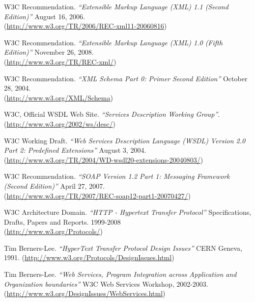 \begin{thebibliography}{99}
 W3C Recommendation. \emph{``Extensible Markup Language (XML) 1.1
(Second Edition)''} August 16, 2006.\\
(\href{http://www.w3.org/TR/2006/REC-xml11-20060816}{http://www.w3.org/TR/2006/REC-xml11-20060816})

 W3C Recommendation. \emph{``Extensible Markup Language (XML) 1.0
(Fifth Edition)''} November 26, 2008.\\
(\href{http://www.w3.org/TR/REC-xml/}{http://www.w3.org/TR/REC-xml/})

 W3C Recommendation. \emph{``XML Schema Part 0: Primer
Second Edition''} October 28, 2004.\\ 
(\href{http://www.w3.org/XML/Schema}{http://www.w3.org/XML/Schema})

 W3C, Official WSDL Web Site. \emph{``Services Description Working
Group''}. \\
(\href{http://www.w3.org/2002/ws/desc/}{http://www.w3.org/2002/ws/desc/})

 W3C Working Draft. \emph{``Web Services Description
Language (WSDL) Version 2.0 Part 2: Predefined Extensions''} August 3, 2004. \\
(\href{http://www.w3.org/TR/2004/WD-wsdl20-extensions-20040803/}{http://www.w3.org/TR/2004/WD-wsdl20-extensions-20040803/})

 W3C Recommendation. \emph{``SOAP Version 1.2 Part 1: Messaging
Framework (Second Edition)''} April 27, 2007. \\
(\href{http://www.w3.org/TR/2007/REC-soap12-part1-20070427/}{http://www.w3.org/TR/2007/REC-soap12-part1-20070427/})

 W3C Architecture Domain. \emph{``HTTP - Hypertext Transfer
Protocol''} Specifications, Drafts, Papers and Reports. 1999-2008\\
(\href{http://www.w3.org/Protocols/}{http://www.w3.org/Protocols/})

 Tim Berners-Lee. \emph{``HyperText Transfer Protocol Design
Issues''} CERN Geneva, 1991. 
(\href{http://www.w3.org/Protocols/DesignIssues.html}{http://www.w3.org/Protocols/DesignIssues.html})

 Tim Berners-Lee. \emph{``Web Services, Program Integration
across Application and Organization boundaries''}  W3C Web Services
Workshop, 2002-2003.
(\href{http://www.w3.org/DesignIssues/WebServices.html}{http://www.w3.org/DesignIssues/WebServices.html})


\end{thebibliography}
